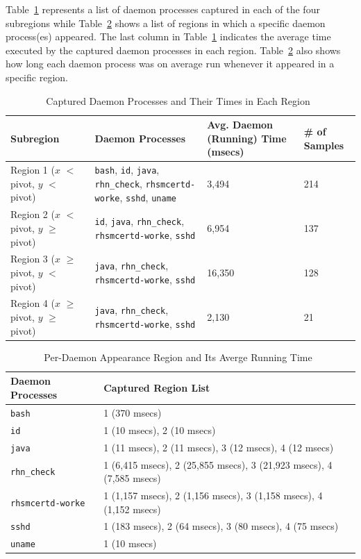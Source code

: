 \documentclass[10pt]{article}
\begin{document}
Table~\ref{fig:dual4096_procs} represents a list of daemon processes captured in each of the four subregions 
while Table~\ref{fig:reg_procs_dual4096} shows a list of regions in which a specific daemon process(es) appeared.
The last column in Table~\ref{fig:dual4096_procs} indicates the average time executed by the captured daemon processes 
in each region. Table~\ref{fig:reg_procs_dual4096} also shows 
how long each daemon process was on average run whenever it appeared in a specific region.
\begin{table}[htp!]
\centering
{
 \begin{tabular}{|l|p{5cm}|p{2cm}|p{2cm}|} \hline
Subregion & Daemon Processes & Avg. Daemon (Running) Time (msecs) & \# of Samples \\ \hline
Region 1 ($x$ $<$ pivot, $y$ $<$ pivot) & {\tt bash}, {\tt id}, {\tt java}, {\tt rhn\_check}, {\tt rhsmcertd-worke}, {\tt sshd}, {\tt uname} & 3,494 & 214\\ \hline
Region 2 ($x$  $<$ pivot,  $y$ $\geq$ pivot) &  {\tt id}, {\tt java}, {\tt rhn\_check}, {\tt rhsmcertd-worke}, {\tt sshd} & 6,954 & 137\\ \hline
Region 3 ($x$  $\geq$ pivot, $y$ $<$ pivot)& {\tt java}, {\tt rhn\_check}, {\tt rhsmcertd-worke}, {\tt sshd}  & 16,350 & 128\\ \hline
Region 4 ($x$  $\geq$ pivot, $y$ $\geq$ pivot) & {\tt java}, {\tt rhn\_check}, {\tt rhsmcertd-worke}, {\tt sshd}  & 2,130 & 21\\ \hline
  \end{tabular}
  }
 \caption{Captured Daemon Processes and Their Times in Each Region~\label{fig:dual4096_procs}}
\end{table}
\begin{table}[htp!]
\centering
{
 \begin{tabular}{|l|l|} \hline
Daemon Processes & Captured Region List \\ \hline
{\tt bash} & 1 (370 msecs)\\ \hline
{\tt id} & 1 (10 msecs), 2 (10 msecs)\\ \hline
{\tt java} & 1 (11 msecs), 2 (11 msecs), 3 (12 msecs), 4 (12 msecs)\\ \hline
{\tt rhn\_check} & 1 (6,415 msecs), 2 (25,855 msecs), 3 (21,923 msecs), 4 (7,585 msecs)\\ \hline
{\tt rhsmcertd-worke} & 1 (1,157 msecs), 2 (1,156 msecs), 3 (1,158 msecs), 4 (1,152 msecs)\\ \hline
{\tt sshd} & 1 (183 msecs), 2 (64 msecs), 3 (80 msecs), 4 (75 msecs)\\ \hline
{\tt uname} & 1 (10 msecs)\\ \hline
  \end{tabular}
  }
 \caption{Per-Daemon Appearance Region and Its Averge Running Time~\label{fig:reg_procs_dual4096}}
\end{table}
\end{document}
